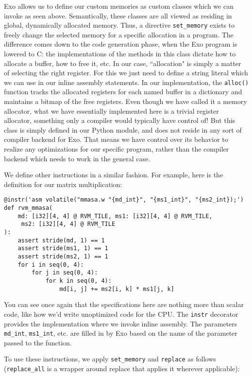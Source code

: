 \documentclass[acmsmall, nonacm=true]{acmart}
\begin{document}
Exo allows us to define our custom memories as custom classes which we can invoke as seen above. Semantically, these classes are all viewed as residing in global, dynamically allocated memory. Thus, a directive \verb|set_memory| exists to freely change the selected memory for a specific allocation in a program. The difference comes down to the code generation phase, when the Exo program is lowered to C: the implementations of the methods in this class dictate how to allocate a buffer, how to free it, etc. In our case, ``allocation" is simply a matter of selecting the right register. For this we just need to define a string literal which we can use in our inline assembly statements. In our implementation, the \verb|alloc()| function tracks the allocated registers for each named buffer in a dictionary and maintains a bitmap of the free registers. Even though we have called it a memory allocator, what we have essentially implemented here is a trivial register allocator, something only a compiler would typically have control of! But this class is simply defined in our Python module, and does not reside in any sort of compiler backend for Exo. That means we have control over its behavior to realize any optimizations for our specific program, rather than the compiler backend which needs to work in the general case.

We define other instructions in a similar fashion. For example, here is the definition for our matrix multiplication:

\begin{verbatim}
@instr('asm volatile("mmasa.w "{md_int}", "{ms1_int}", "{ms2_int});')
def rvm_mmasa(
    md: [i32][4, 4] @ RVM_TILE, ms1: [i32][4, 4] @ RVM_TILE,
     ms2: [i32][4, 4] @ RVM_TILE
):
    assert stride(md, 1) == 1
    assert stride(ms1, 1) == 1
    assert stride(ms2, 1) == 1
    for i in seq(0, 4):
        for j in seq(0, 4):
            for k in seq(0, 4):
                md[i, j] += ms2[i, k] * ms1[j, k]
\end{verbatim}

You can see once again that the specifications here are nothing more than scalar code, like how we'd write unoptimized code for the CPU. The \verb|instr| decorator provides the implementation where we invoke inline assembly. The parameters \verb|md_int|, \verb|ms1_int|, etc. are filled in by Exo based on the name of the parameter passed to the function.

To use these instructions, we apply \verb|set_memory| and \verb|replace| as follows (\verb|replace_all| is a wrapper around replace that applies it wherever applicable):
\end{document}
